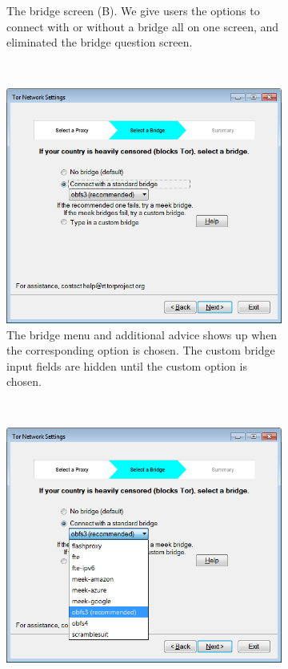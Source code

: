 \documentclass[USenglish,oneside,twocolumn]{article}
\begin{document}
\begin{figure}
\begin{subfigure}[b]{0.30\textwidth}
	\caption{The bridge screen (B). We give users the options to connect with or without a bridge all on one screen, and eliminated the bridge question screen.}
	\label{fig:new-nobridge}
\end{subfigure}
~~~~~~~~~~~~~~~~~~~~~~~~~
\begin{subfigure}[b]{0.30\textwidth}
	\includegraphics[width=\textwidth]{screenshots/NEW-bridgeSettings-default.png}
	\centering\captionsetup{width=1.5\linewidth}%
	\caption{The bridge menu and additional advice shows up when the corresponding option is chosen. The custom bridge input fields are hidden until the custom option is chosen.}
	\label{fig:new-bridge}
\end{subfigure}
~~~~~~~~~~
\begin{subfigure}[b]{0.30\textwidth}
	\includegraphics[width=\textwidth]{screenshots/NEW-bridgeSettings-combobox.png}

\end{subfigure}
\end{figure}
\end{document}
